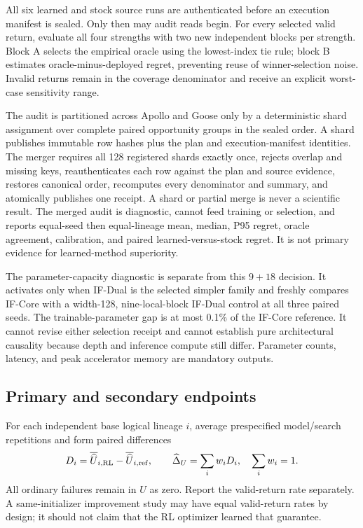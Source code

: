 All six learned and stock source runs are authenticated before an execution manifest is sealed. Only then may audit reads begin. For every selected valid return, evaluate all four strengths with two new independent blocks per strength. Block A selects the empirical oracle using the lowest-index tie rule; block B estimates oracle-minus-deployed regret, preventing reuse of winner-selection noise. Invalid returns remain in the coverage denominator and receive an explicit worst-case sensitivity range.

The audit is partitioned across Apollo and Goose only by a deterministic shard assignment over complete paired opportunity groups in the sealed order. A shard publishes immutable row hashes plus the plan and execution-manifest identities. The merger requires all 128 registered shards exactly once, rejects overlap and missing keys, reauthenticates each row against the plan and source evidence, restores canonical order, recomputes every denominator and summary, and atomically publishes one receipt. A shard or partial merge is never a scientific result. The merged audit is diagnostic, cannot feed training or selection, and reports equal-seed then equal-lineage mean, median, P95 regret, oracle agreement, calibration, and paired learned-versus-stock regret. It is not primary evidence for learned-method superiority.

The parameter-capacity diagnostic is separate from this $9+18$ decision. It activates only when IF-Dual is the selected simpler family and freshly compares IF-Core with a width-128, nine-local-block IF-Dual control at all three paired seeds. The trainable-parameter gap is at most 0.1\% of the IF-Core reference. It cannot revise either selection receipt and cannot establish pure architectural causality because depth and inference compute still differ. Parameter counts, latency, and peak accelerator memory are mandatory outputs.

\subsection{Primary and secondary endpoints}
For each independent base logical lineage $i$, average prespecified model/search repetitions and form paired differences
\begin{equation}
D_i=\overline{\widehat U}_{i,\rm RL}-\overline{\widehat U}_{i,\rm ref},\qquad
\widehat\Delta_U=\sum_i w_iD_i,\quad \sum_iw_i=1.
\end{equation}
All ordinary failures remain in $\widehat U$ as zero. Report the valid-return rate separately. A same-initializer improvement study may have equal valid-return rates by design; it should not claim that the RL optimizer learned that guarantee.

